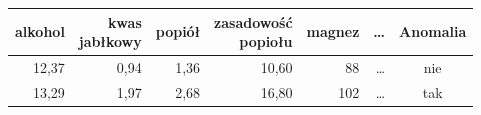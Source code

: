 \begin{tabular}{rrrrrrc}
\toprule
alkohol & \makecell{kwas\\jabłkowy} & popiół & \makecell{zasadowość\\popiołu} & magnez & \dots & Anomalia \\
\midrule
12,37 & 0,94 & 1,36 & 10,60 & 88 & \dots & nie \\
13,29 & 1,97 & 2,68 & 16,80 & 102 & \dots & tak \\
\bottomrule
\end{tabular}
